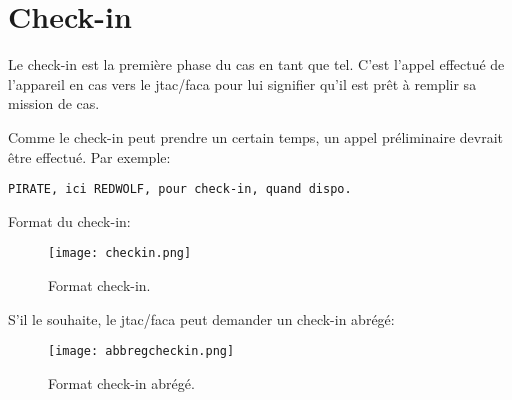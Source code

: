 \section{Check-in}

\e
    \item
    Le check-in est la première phase du \acrshort{cas} en tant que tel. C’est l’appel effectué de l’appareil en \acrshort{cas} vers le \acrshort{jtac}/\acrshort{faca} pour lui signifier qu’il est prêt à remplir sa mission de \acrshort{cas}.
    \item Comme le check-in peut prendre un certain temps, un appel préliminaire devrait être effectué. Par exemple:
\ed

\begin{lstlisting}[caption=Appel préliminaire, label=preliminary_call]
    PIRATE, ici REDWOLF, pour check-in, quand dispo.
\end{lstlisting}

\re
    \item Format du check-in:
    \begin{figure}[H]
        \texttt{[image: checkin.png]}
        \caption{Format check-in.}
        \label{fig:checkin}
    \end{figure}
    \item S'il le souhaite, le \acrshort{jtac}/\acrshort{faca} peut demander un check-in abrégé:
    \begin{figure}[H]
        \texttt{[image: abbregcheckin.png]}
        \caption{Format check-in abrégé.}
        \label{fig:abbregcheckin}
    \end{figure}
\ed
